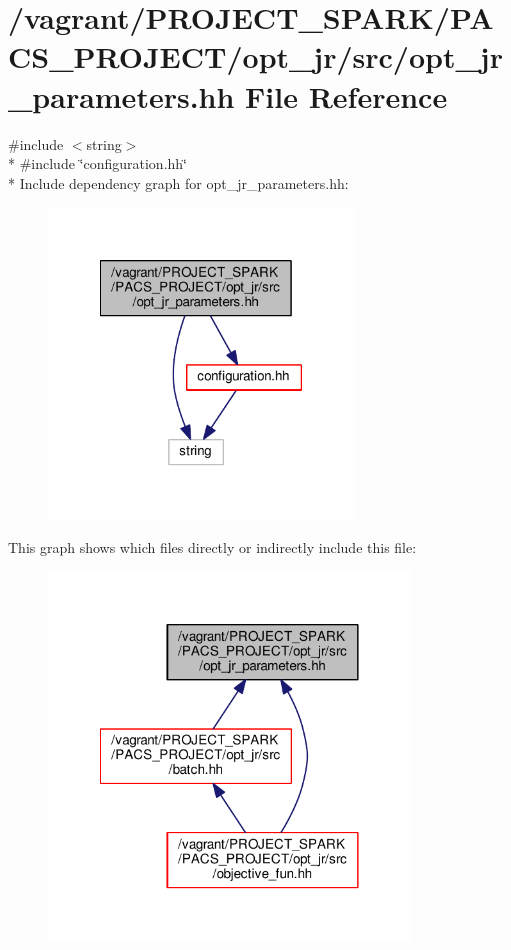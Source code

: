 \hypertarget{opt__jr__parameters_8hh}{\section{/vagrant/\-P\-R\-O\-J\-E\-C\-T\-\_\-\-S\-P\-A\-R\-K/\-P\-A\-C\-S\-\_\-\-P\-R\-O\-J\-E\-C\-T/opt\-\_\-jr/src/opt\-\_\-jr\-\_\-parameters.hh File Reference}
\label{opt__jr__parameters_8hh}
}
{\ttfamily \#include $<$string$>$}\\*
{\ttfamily \#include \char`\"{}configuration.\-hh\char`\"{}}\\*
Include dependency graph for opt\-\_\-jr\-\_\-parameters.\-hh\-:
\nopagebreak
\begin{figure}[H]
\begin{center}
\leavevmode
\includegraphics[width=230pt]{opt__jr__parameters_8hh__incl}
\end{center}
\end{figure}
This graph shows which files directly or indirectly include this file\-:
\nopagebreak
\begin{figure}[H]
\begin{center}
\leavevmode
\includegraphics[width=272pt]{opt__jr__parameters_8hh__dep__incl}
\end{center}
\end{figure}
